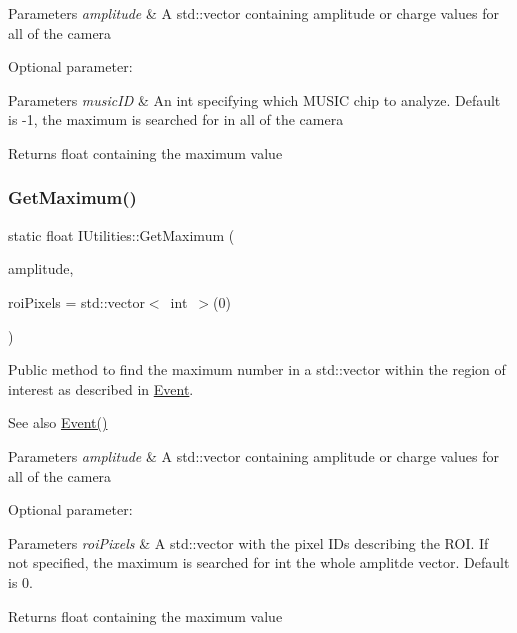 \begin{DoxyParams}{Parameters}
{\em amplitude} & A std\+::vector containing amplitude or charge values for all of the camera\\
\hline
\end{DoxyParams}
Optional parameter\+: 
\begin{DoxyParams}{Parameters}
{\em music\+ID} & An int specifying which M\+U\+S\+IC chip to analyze. Default is -\/1, the maximum is searched for in all of the camera\\
\hline
\end{DoxyParams}
\begin{DoxyReturn}{Returns}
float containing the maximum value 
\end{DoxyReturn}
\mbox{\label{classIUtilities_af77a578e3f7924e82545205e3a766bd0}} 
\subsubsection{\texorpdfstring{Get\+Maximum()}{GetMaximum()}\hspace{0.1cm}{\footnotesize\ttfamily [2/2]}}
{\footnotesize\ttfamily static float I\+Utilities\+::\+Get\+Maximum (\begin{DoxyParamCaption}\item[{std\+::vector$<$ float $>$}]{amplitude,  }\item[{std\+::vector$<$ int $>$}]{roi\+Pixels = {\ttfamily std\+:\+:vector$<$~int~$>$(0)} }\end{DoxyParamCaption})\hspace{0.3cm}{\ttfamily [static]}}



Public method to find the maximum number in a std\+::vector within the region of interest as described in \hyperlink{classEvent}{Event}. 

\begin{DoxySeeAlso}{See also}
\hyperlink{classEvent}{Event()}
\end{DoxySeeAlso}

\begin{DoxyParams}{Parameters}
{\em amplitude} & A std\+::vector containing amplitude or charge values for all of the camera\\
\hline
\end{DoxyParams}
Optional parameter\+: 
\begin{DoxyParams}{Parameters}
{\em roi\+Pixels} & A std\+::vector with the pixel I\+Ds describing the R\+OI. If not specified, the maximum is searched for int the whole amplitde vector. Default is 0.\\
\hline
\end{DoxyParams}
\begin{DoxyReturn}{Returns}
float containing the maximum value 
\end{DoxyReturn}
\mbox{\label{classIUtilities_a6a2664bbaa82bed0028c676a2b1b411a}} 
